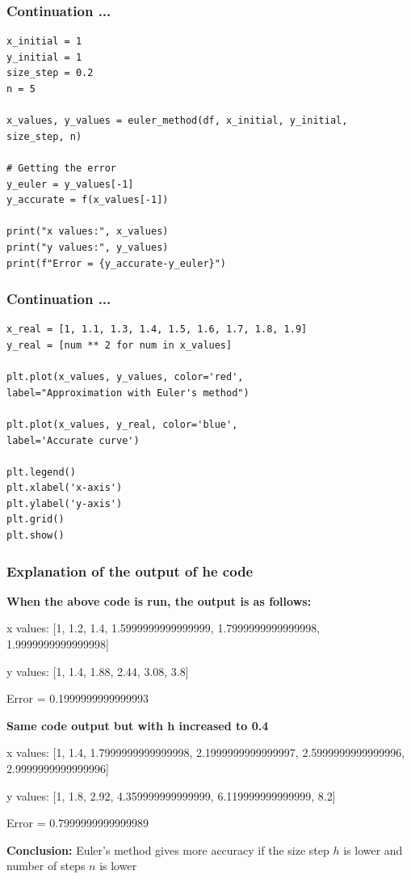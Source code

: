 \documentclass{beamer}
\begin{document}
\begin{frame}[fragile]
  \frametitle{Continuation ...}
   \begin{verbatim}
x_initial = 1
y_initial = 1
size_step = 0.2
n = 5

x_values, y_values = euler_method(df, x_initial, y_initial, 
size_step, n)

# Getting the error
y_euler = y_values[-1]
y_accurate = f(x_values[-1])

print("x values:", x_values)
print("y values:", y_values)
print(f"Error = {y_accurate-y_euler}")
\end{verbatim}
\end{frame}

\begin{frame}[fragile]
  \frametitle{Continuation ...}
   \begin{verbatim}
x_real = [1, 1.1, 1.3, 1.4, 1.5, 1.6, 1.7, 1.8, 1.9]
y_real = [num ** 2 for num in x_values]

plt.plot(x_values, y_values, color='red',
label="Approximation with Euler's method")

plt.plot(x_values, y_real, color='blue',
label='Accurate curve')

plt.legend()
plt.xlabel('x-axis')
plt.ylabel('y-axis')
plt.grid()
plt.show()

  \end{verbatim}
\end{frame}

\begin{frame}[fragile]
  \frametitle{Explanation of the output of he code}
  \textbf{When the above code is run, the output is as follows:}
  
  x values: [1, 1.2, 1.4, 1.5999999999999999, 1.7999999999999998, 1.9999999999999998]
  
   y values: [1, 1.4, 1.88, 2.44, 3.08, 3.8]
   
  Error = 0.1999999999999993

  \textbf{Same code output but with h increased to 0.4}

  x values: [1, 1.4, 1.7999999999999998, 2.1999999999999997, 2.5999999999999996, 2.9999999999999996]
  
y values: [1, 1.8, 2.92, 4.359999999999999, 6.119999999999999, 8.2]

Error = 0.7999999999999989

\textbf{Conclusion:} Euler's method gives more accuracy if the size step $h$ is lower and number of steps $n$ is lower
  
\end{frame}
\end{document}
